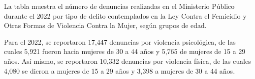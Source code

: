 La tabla muestra el número de denuncias realizadas en el Ministerio Público durante el 2022 por tipo de delito contemplados en la Ley Contra el Femicidio y Otras Formas de Violencia Contra la Mujer, según grupos de edad.

Para el 2022, se reportaron 17,447 denuncias por violencia psicológica, de las cuales 5,921 fueron hacia mujeres de 30 a 44 años y 5,765 de mujeres de 15 a 29 años. Así mismo, se reportaron 10,332 denuncias por violencia física, de las cuales 4,080 se dieron a mujeres de 15 a 29 años y 3,398 a mujeres de 30 a 44 años. 